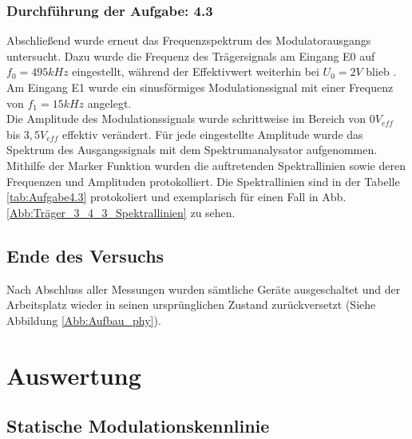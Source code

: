 \documentclass[12pt]{scrartcl}
\begin{document}
\subsubsection*{Durchführung der Aufgabe: 4.3}
Abschließend wurde erneut das Frequenzspektrum des Modulatorausgangs untersucht. Dazu wurde die Frequenz des Trägersignals am Eingang E0 auf $f_0= 495 kHz$ eingestellt, während der Effektivwert 
weiterhin bei $U_0=2 V$ blieb . Am Eingang E1 wurde ein sinusförmiges Modulationssignal mit einer Frequenz von $f_1=15 kHz$ angelegt. \\
Die Amplitude des Modulationssignals wurde schrittweise im Bereich von $0 V_{eff}$ bis $3,5 V_{eff}$ effektiv verändert. Für jede eingestellte Amplitude wurde das Spektrum des Ausgangssignals 
mit dem Spektrumanalysator aufgenommen. Mithilfe der Marker Funktion wurden die auftretenden Spektrallinien sowie deren Frequenzen und Amplituden  protokolliert. Die Spektrallinien sind in der
 Tabelle \ref{tab:Aufgabe4.3} protokoliert und exemplarisch für einen Fall in Abb. \ref{Abb:Träger_3_4_3_Spektrallinien} zu sehen. 








\subsection{Ende des Versuchs}
Nach Abschluss aller Messungen wurden sämtliche Geräte ausgeschaltet und der Arbeitsplatz wieder in seinen ursprünglichen Zustand zurückversetzt (Siehe Abbildung \ref{Abb:Aufbau_phy}).


\newpage
\section{Auswertung}
\label{kap:Auswertung}
\subsection{Statische Modulationskennlinie}
\label{kap:1}
\end{document}
